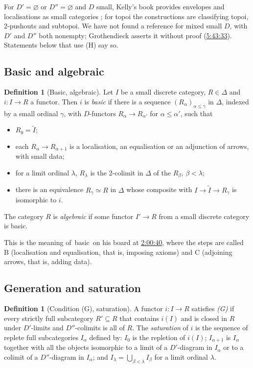 \documentclass[11pt,a4paper]{amsart}
\theoremstyle{definition}
\newtheorem{definition}[theorem]{Definition}
\theoremstyle{remark}
\newcommand{\q}[1]{\guillemotleft\,#1\,\guillemotright}
\newcommand{\ts}[3]{\href{https://www.youtube.com/watch?v=#1&t=#2}{#3}}
\begin{document}
For $D'=\varnothing$ or $D''=\varnothing$ and $D$ small, Kelly's book provides envelopes and localisations as small categories \cite[Thm~5.35, Prop.~6.21, Cor.~6.22, Thm~6.23]{kellybook}; for topoi the constructions are classifying topoi, 2-pushouts and subtopoi. We have not found a reference for mixed small $D$, with $D'$ and $D''$ both nonempty; Grothendieck asserts it without proof (\ts{PqCQM3Pcl6Q}{5h43m33s}{5:43:33}). Statements below that use (H) say so.

\subsection{Basic and algebraic}

\begin{definition}[Basic, algebraic]\label{d:basic}
Let $I$ be a small discrete category, $R\in\Delta$ and $i\colon I\to R$ a functor. Then $i$ is \emph{basic} if there is a sequence $(R_\alpha)_{\alpha\le\gamma}$ in $\Delta$, indexed by a small ordinal $\gamma$, with $D$-functors $R_\alpha\to R_{\alpha'}$ for $\alpha\le\alpha'$, such that
\begin{itemize}
\item $R_0=\widetilde I$;
\item each $R_\alpha\to R_{\alpha+1}$ is a localisation, an equalisation or an adjunction of arrows, with small data;
\item for a limit ordinal $\lambda$, $R_\lambda$ is the 2-colimit in $\Delta$ of the $R_\beta$, $\beta<\lambda$;
\item there is an equivalence $R_\gamma\simeq R$ in $\Delta$ whose composite with $I\to\widetilde I\to R_\gamma$ is isomorphic to $i$.
\end{itemize}
The category $R$ is \emph{algebraic} if some functor $I'\to R$ from a small discrete category is basic.
\end{definition}

This is the meaning of \q{basic} on his board at \ts{4gynb9uTEE4}{2h0m40s}{2:00:40}, where the steps are called B (localisation and equalisation, that is, imposing axioms) and C (adjoining arrows, that is, adding data).

\subsection{Generation and saturation}

\begin{definition}[Condition (G), saturation]\label{d:G}
A functor $i\colon I\to R$ satisfies \emph{(G)} if every strictly full subcategory $R'\subseteq R$ that contains $i(I)$ and is closed in $R$ under $D'$-limits and $D''$-colimits is all of $R$. The \emph{saturation} of $i$ is the sequence of replete full subcategories $I_\alpha$ defined by: $I_0$ is the repletion of $i(I)$; $I_{\alpha+1}$ is $I_\alpha$ together with all the objects isomorphic to a limit of a $D'$-diagram in $I_\alpha$ or to a colimit of a $D''$-diagram in $I_\alpha$; and $I_\lambda=\bigcup_{\beta<\lambda}I_\beta$ for a limit ordinal $\lambda$.
\end{definition}
\end{document}
